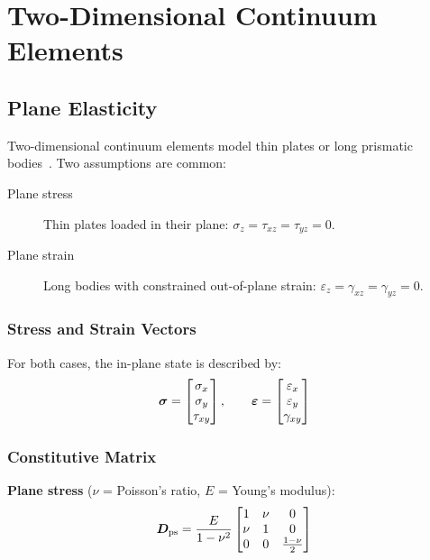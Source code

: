 \chapter{Two-Dimensional Continuum Elements}
\label{ch:2d_continuum}

\section{Plane Elasticity}

Two-dimensional continuum elements model thin plates or long prismatic
bodies~\cite{bathe2006finite,hughes2000fem}. Two assumptions are common:
\begin{description}
    \item[Plane stress] Thin plates loaded in their plane: $\sigma_z = \tau_{xz} = \tau_{yz} = 0$.
    \item[Plane strain] Long bodies with constrained out-of-plane strain: $\varepsilon_z = \gamma_{xz} = \gamma_{yz} = 0$.
\end{description}

\subsection{Stress and Strain Vectors}

For both cases, the in-plane state is described by:
\begin{equation}
    \bm{\sigma} = \begin{bmatrix}\sigma_x \\ \sigma_y \\ \tau_{xy}\end{bmatrix},
    \qquad
    \bm{\varepsilon} = \begin{bmatrix}\varepsilon_x \\ \varepsilon_y \\ \gamma_{xy}\end{bmatrix}
    \label{eq:2d_stress_strain}
\end{equation}

\subsection{Constitutive Matrix}

\textbf{Plane stress} ($\nu$ = Poisson's ratio, $E$ = Young's modulus):
\begin{equation}
    \bm{D}_{\text{ps}} = \frac{E}{1-\nu^2}
    \begin{bmatrix} 1 & \nu & 0 \\ \nu & 1 & 0 \\ 0 & 0 & \frac{1-\nu}{2} \end{bmatrix}
    \label{eq:D_planestress}
\end{equation}

